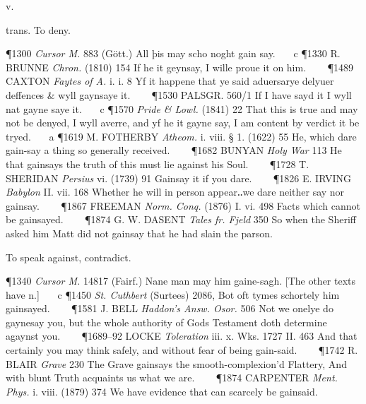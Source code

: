 \begin{description}[wide, labelwidth=!, labelindent=0pt]
 v.

\noindent {}

\vspace{-0.3cm}

\begin{myenumerate}

 trans. To deny.

\P 1300  \textit{Cursor M.} 883 (Gött.) All þis may scho noght gain say.    c 
\P 1330 R. BRUNNE  \textit{Chron.} (1810) 154 If he it geynsay, I wille proue it on him.    
\P 1489 CAXTON  \textit{Faytes of A.} i. i. 8 Yf it happene that ye said aduersarye delyuer deffences \& wyll gaynsaye it.    
\P 1530 PALSGR. 560/1 If I have sayd it I wyll nat gayne saye it.    c 
\P 1570 \textit{Pride \& Lowl.}  (1841) 22 That this is true and may not be denyed, I wyll averre, and yf he it gayne say, I am content by verdict it be tryed.    a 
\P 1619 M. FOTHERBY  \textit{Atheom.} i. viii. § 1. (1622) 55 He, which dare gain-say a thing so generally received.    
\P 1682 BUNYAN  \textit{Holy War} 113 He that gainsays the truth of this must lie against his Soul.    
\P 1728 T. SHERIDAN  \textit{Persius} vi. (1739) 91 Gainsay it if you dare.    
\P 1826 E. IRVING  \textit{Babylon} II. vii. 168 Whether he will in person appear‥we dare neither say nor gainsay.    
\P 1867 FREEMAN  \textit{Norm. Conq.} (1876) I. vi. 498 Facts which cannot be gainsayed.    
\P 1874 G. W. DASENT  \textit{Tales fr. Fjeld} 350 So when the Sheriff asked him Matt did not gainsay that he had slain the parson.

 To speak against, contradict.

\P 1340  \textit{Cursor M.} 14817 (Fairf.) Nane man may him gaine-sagh. [The other texts have n.]    c 
\P 1450 \textit{St. Cuthbert}  (Surtees) 2086, Bot oft tymes schortely him gainsayed.    
\P 1581 J. BELL  \textit{Haddon's Answ. Osor.} 506 Not we onelye do gaynesay you, but the whole authority of Gods Testament doth determine agaynst you.    
\P 1689–92 LOCKE \textit{Toleration} iii. x. Wks. 1727 II. 463  And that certainly you may think safely, and without fear of being gain-said.    
\P 1742 R. BLAIR  \textit{Grave} 230 The Grave gainsays the smooth-complexion'd Flattery, And with blunt Truth acquaints us what we are.    
\P 1874 CARPENTER  \textit{Ment. Phys.} i. viii. (1879) 374 We have evidence that can scarcely be gainsaid.


\end{myenumerate}
\end{description}
